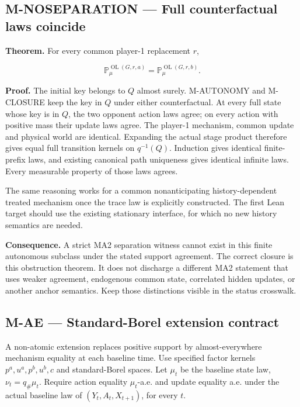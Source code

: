 \documentclass[
  11pt,
  a4paper,
]{article}
\newcommand{\codewrap}[1]{{\ttfamily\seqsplit{#1}}}
\begin{document}
\subsection{M-NOSEPARATION --- Full counterfactual laws
coincide}\label{m-noseparation-full-counterfactual-laws-coincide}

\textbf{Theorem.} For every common player-1 replacement \(r\),

\[\mathbb P_\mu^{\operatorname{OL}(G,r,a)}
=\mathbb P_\mu^{\operatorname{OL}(G,r,b)}.\]

\textbf{Proof.} The initial key belongs to \(Q\) almost surely.
M-AUTONOMY and M-CLOSURE keep the key in \(Q\) under either
counterfactual. At every full state whose key is in \(Q\), the two
opponent action laws agree; on every action with positive mass their
update laws agree. The player-1 mechanism, common update and physical
world are identical. Expanding the actual stage product therefore gives
equal full transition kernels on \(q^{-1}(Q)\). Induction gives
identical finite-prefix laws, and existing canonical path uniqueness
gives identical infinite laws. Every measurable property of those laws
agrees.

The same reasoning works for a common nonanticipating history-dependent
treated mechanism once the trace law is explicitly constructed. The
first Lean target should use the existing stationary
\codewrap{PlayerOneMechanism} interface, for which no new history
semantics are needed.

\textbf{Consequence.} A strict MA2 separation witness cannot exist in
this finite autonomous subclass under the stated support agreement. The
correct closure is this obstruction theorem. It does not discharge a
different MA2 statement that uses weaker agreement, endogenous common
state, correlated hidden updates, or another anchor semantics. Keep
those distinctions visible in the status crosswalk.

\subsection{M-AE --- Standard-Borel extension
contract}\label{m-ae-standard-borel-extension-contract}

A non-atomic extension replaces positive support by almost-everywhere
mechanism equality at each baseline time. Use specified factor kernels
\(p^a,u^a,p^b,u^b,c\) and standard-Borel spaces. Let \(\mu_t\) be the
baseline state law, \(\nu_t=q_\#\mu_t\). Require action equality
\(\mu_t\)-a.e. and update equality a.e. under the actual baseline law of
\((Y_t,A_t,X_{t+1})\), for every \(t\).
\end{document}
